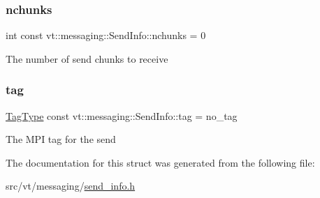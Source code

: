 \subsubsection{\texorpdfstring{nchunks}{nchunks}}
{\footnotesize\ttfamily int const vt\+::messaging\+::\+Send\+Info\+::nchunks = 0\hspace{0.3cm}{\ttfamily [private]}}

The number of send chunks to receive \mbox{\label{structvt_1_1messaging_1_1_send_info_a2019e919629f4d5e3f3bca818136535b}} 
\subsubsection{\texorpdfstring{tag}{tag}}
{\footnotesize\ttfamily \hyperlink{namespacevt_a84ab281dae04a52a4b243d6bf62d0e52}{Tag\+Type} const vt\+::messaging\+::\+Send\+Info\+::tag = no\+\_\+tag\hspace{0.3cm}{\ttfamily [private]}}

The M\+PI tag for the send 

The documentation for this struct was generated from the following file\+:\begin{DoxyCompactItemize}
\item 
src/vt/messaging/\hyperlink{send__info_8h}{send\+\_\+info.\+h}\end{DoxyCompactItemize}
